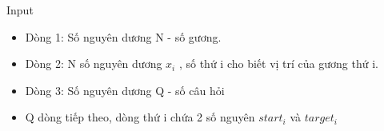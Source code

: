 Input
\begin{itemize}
	\item Dòng 1: Số nguyên dương N - số gương.
	\item Dòng 2: N số nguyên dương $x_{i}$ , số thứ i cho biết vị trí của gương thứ i.
	\item Dòng 3: Số nguyên dương Q - số câu hỏi
	\item Q dòng tiếp theo, dòng thứ i chứa 2 số nguyên $start_{i}$ và $target_{i}$
\end{itemize}